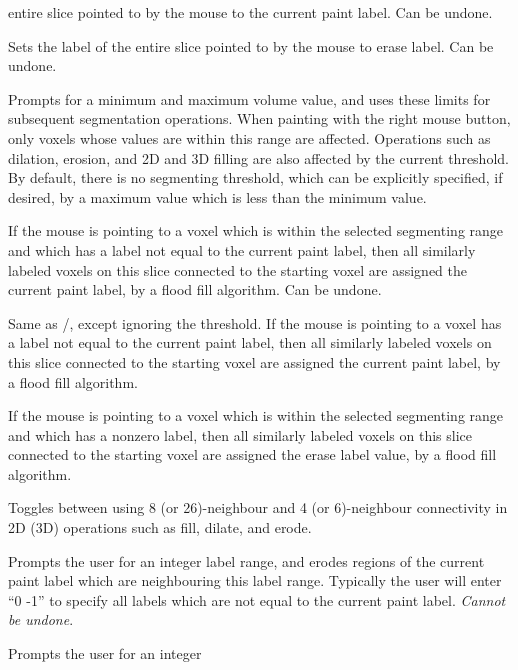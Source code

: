 \documentclass[11pt,letterpaper]{article}
\newcommand{\menutwo}[2]{{\scriptsize \fbox{\bf #1}/\fbox{\bf #2}}}
\begin{document}
\begin{description}
  entire slice pointed to by the mouse to the current paint label. Can
  be undone.
\item[\menutwo{Segmenting}{Clear Slice}]  Sets the label of the 
  entire slice pointed to by the mouse to erase label. Can be undone.
\item[\menutwo{Segmenting}{Set Threshold}]  Prompts for a minimum and
  maximum volume value, and uses these limits for subsequent segmentation
  operations.  When painting with the right mouse button, only
  voxels whose values are within this range are affected.  Operations
  such as dilation, erosion, and 2D and 3D filling are also affected by
  the current threshold.  By default, there is no segmenting threshold,
  which can be explicitly specified, if desired, by a maximum value which is 
  less than the minimum value.
\item[\menutwo{Segmenting}{Label Fill}] If the mouse is pointing to a
  voxel which is within the selected segmenting range and which has a
  label not equal to the current paint label, then all similarly labeled
  voxels on this slice connected to the starting voxel are assigned the
  current paint label, by a flood fill algorithm. Can be undone.
\item[\menutwo{Segmenting}{Label Fill No Thrs}] Same as
  \menutwo{Segmenting}{Label Fill}, except ignoring the threshold. If
  the mouse is pointing to a voxel has a label not equal to the current
  paint label, then all similarly labeled voxels on this slice connected
  to the starting voxel are assigned the current paint label, by a flood
  fill algorithm.
\item[\menutwo{Segmenting}{Clear Fill}] If the mouse is pointing to a
  voxel which is within the selected segmenting range and which has a
  nonzero label, then all similarly labeled voxels on this slice
  connected to the starting voxel are assigned the erase label value, by
  a flood fill algorithm.
\item[\menutwo{Segmenting}{Connectivity}] Toggles between using 8 (or
  26)-neighbour and 4 (or 6)-neighbour connectivity in 2D (3D)
  operations such as fill, dilate, and erode.
\item[\menutwo{Segmenting}{Erode 3D}] Prompts the user for an integer
  label range, and erodes regions of the current paint label which are
  neighbouring this label range. Typically the user will enter
  ``0 -1'' to specify all labels which are not equal to the current
  paint label. {\em Cannot be undone}.
\item[\menutwo{Segmenting}{Dilate 3D}] Prompts the user for an integer

\end{description}
\end{document}
